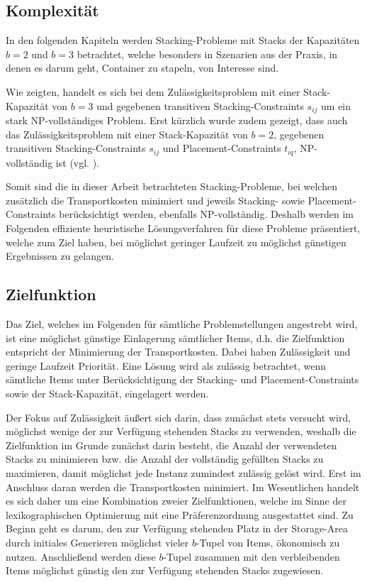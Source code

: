 \subsection{Komplexität}
\label{sec:complexity}

In den folgenden Kapiteln werden Stacking-Probleme mit Stacks der Kapazitäten $b = 2$
und $b = 3 $ betrachtet, welche besonders in Szenarien aus der Praxis, in denen es darum geht,
Container zu stapeln, von Interesse sind.

Wie \citet{Bruns2015} zeigten, handelt es sich bei dem Zulässigkeitsproblem mit einer Stack-Kapazität von $b=3$ und gegebenen transitiven Stacking-Constraints $s_{ij}$ um ein stark NP-vollständiges Problem. Erst kürzlich wurde zudem gezeigt, dass auch das Zulässigkeitsproblem mit einer Stack-Kapazität von $b=2$, gegebenen transitiven
Stacking-Constraints $s_{ij}$ und Placement-Constraints $t_{iq}$, NP-vollständig ist (vgl. \citet{Chernykh2019}).

Somit sind die in dieser Arbeit betrachteten Stacking-Probleme, bei welchen zusätzlich die Transportkosten minimiert
und jeweils Stacking- sowie Placement-Constraints berücksichtigt werden, ebenfalls NP-vollständig.
Deshalb werden im Folgenden effiziente heuristische Lösungsverfahren für diese Probleme präsentiert,
welche zum Ziel haben, bei möglichst geringer Laufzeit zu möglichst günstigen Ergebnissen zu gelangen.

\subsection{Zielfunktion}
\label{sec:objective}

Das Ziel, welches im Folgenden für sämtliche Problemstellungen angestrebt wird, ist eine möglichst günstige
Einlagerung sämtlicher Items, d.h. die Zielfunktion entspricht der Minimierung der Transportkosten.
Dabei haben Zulässigkeit und geringe Laufzeit Priorität. Eine Lösung wird als zulässig betrachtet,
wenn sämtliche Items unter Berücksichtigung der Stacking- und Placement-Constraints sowie der Stack-Kapazität, eingelagert werden.

Der Fokus auf Zulässigkeit äußert sich darin, dass zunächst stets versucht wird, möglichst wenige der zur Verfügung stehenden Stacks zu verwenden, weshalb die Zielfunktion im Grunde zunächst darin besteht, die Anzahl der verwendeten Stacks zu minimieren bzw. die Anzahl der vollständig gefüllten Stacks zu maximieren, damit möglichst jede Instanz zumindest zulässig gelöst wird.
Erst im Anschluss daran werden die Transportkosten minimiert.
Im Wesentlichen handelt es sich daher um eine Kombination zweier Zielfunktionen,
welche im Sinne der lexikographischen Optimierung mit eine Präferenzordnung ausgestattet sind.
Zu Beginn geht es darum, den zur Verfügung stehenden Platz in der Storage-Area durch initiales Generieren
möglichst vieler $b$-Tupel von Items, ökonomisch zu nutzen. Anschließend werden diese $b$-Tupel
zusammen mit den verbleibenden Items möglichst günstig den zur Verfügung stehenden Stacks zugewiesen.

